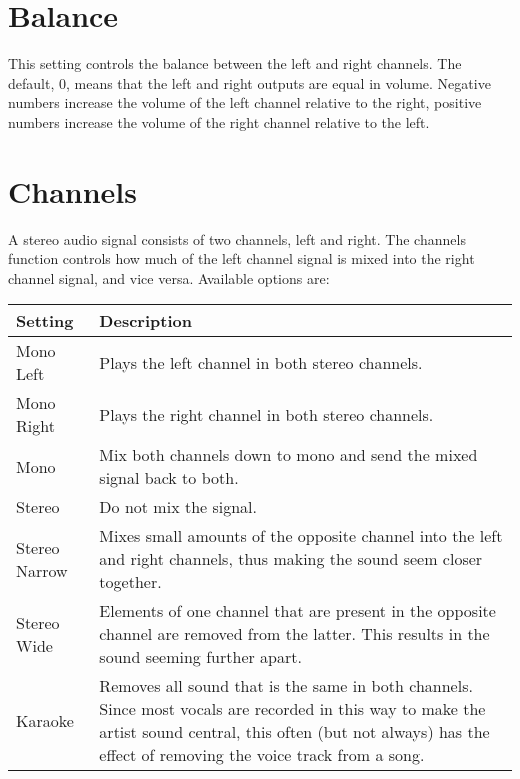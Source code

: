 \section{Balance}
  This setting controls the balance between the left and right channels.  The default, 0, means that the left and right outputs are equal in volume.  Negative numbers increase the volume of the left channel relative to the right, positive numbers increase the volume of the right channel relative to the left.

\section{Channels}
  A stereo audio signal consists of two channels, left and right.  The channels function controls how much of the left channel signal is mixed into the right channel signal, and vice versa.
  Available options are:
  
  \begin{tabularx}{\textwidth}{lX}\toprule
      \textbf{Setting} & \textbf{Description} \\\midrule
        Mono Left & Plays the left channel in both stereo channels. \\
        Mono Right & Plays the right channel in both stereo channels. \\
        Mono & Mix both channels down to mono and send the mixed signal back to both. \\
        Stereo & Do not mix the signal. \\
        Stereo Narrow & Mixes small amounts of the opposite channel into the left and right channels, thus making the sound seem closer together. \\
				Stereo Wide & Elements of one channel that are present in the opposite channel are removed from the latter.  This results in the sound seeming further apart. \\
				Karaoke & Removes all sound that is the same in both channels. Since most vocals are recorded in this way to make the artist sound central, this often (but not always) has the effect of removing the voice track from a song. \\
			\bottomrule
    \end{tabularx}
      
  
